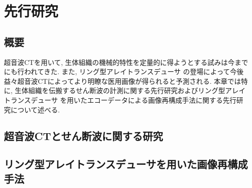 \chapter{先行研究}
\newpage
\section{概要}
超音波CTを用いて, 生体組織の機械的特性を定量的に得ようとする試みは今までにも行われてきた. また, リング型アレイトランスデューサ の登場によって今後益々超音波CTによってより明瞭な医用画像が得られると予測される. 本章では特に, 生体組織を伝搬するせん断波の計測に関する先行研究およびリング型アレイトランスデューサ を用いたエコーデータによる画像再構成手法に関する先行研究について述べる. 
\section{超音波CTとせん断波に関する研究}
\section{リング型アレイトランスデューサを用いた画像再構成手法}